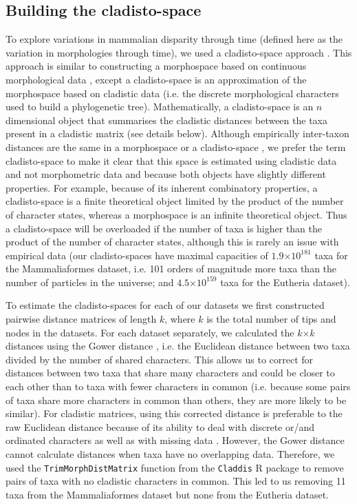 \documentclass[10pt,letterpaper]{article}
\begin{document}
\subsection{Building the cladisto-space}
To explore variations in mammalian disparity through time (defined here as the variation in morphologies through time), we used a cladisto-space approach \citep[e.g.][]{Foote01071994,Foote29111996,Wesley-Hunt2005,Brusatte12092008,friedmanexplosive2010,toljagictriassic-jurassic2013,Hughes20082013}.
This approach is similar to constructing a morphospace based on continuous morphological data \citep[e.g.][]{friedmanexplosive2010}, except a cladisto-space is an approximation of the morphospace based on cladistic data (i.e. the discrete morphological characters used to build a phylogenetic tree).
Mathematically, a cladisto-space is an $n$ dimensional object that summarises the cladistic distances between the taxa present in a cladistic matrix (see details below).
Although empirically inter-taxon distances are the same in a morphospace or a cladisto-space \citep{foth2012different,hetherington2015cladistic}, we prefer the term cladisto-space to make it clear that this space is estimated using cladistic data and not morphometric data and because both objects have slightly different properties.
For example, because of its inherent combinatory properties, a cladisto-space is a finite theoretical object limited by the product of the number of character states, whereas a morphospace is an infinite theoretical object.
Thus a cladisto-space will be overloaded if the number of taxa is higher than the product of the number of character states, although this is rarely an issue with empirical data (our cladisto-spaces have maximal capacities of $1.9$$\times$$10^{181}$ taxa for the Mammaliaformes dataset, i.e. 101 orders of magnitude more taxa than the number of particles in the universe; and $4.5$$\times$$10^{159}$ taxa for the Eutheria dataset).

To estimate the cladisto-spaces for each of our datasets we first constructed pairwise distance matrices of length $k$, where $k$ is the total number of tips and nodes in the datasets.
For each dataset separately, we calculated the $k$$\times$$k$ distances using the Gower distance \citep{Gower71}, i.e. the Euclidean distance between two taxa divided by the number of shared characters. 
This allows us to correct for distances between two taxa that share many characters and could be closer to each other than to taxa with fewer characters in common (i.e. because some pairs of taxa share more characters in common than others, they are more likely to be similar).
For cladistic matrices, using this corrected distance is preferable to the raw Euclidean distance because of its ability to deal with discrete or/and ordinated characters as well as with missing data \citep{anderson2012using}.
However, the Gower distance cannot calculate distances when taxa have no overlapping data.
Therefore, we used the \texttt{TrimMorphDistMatrix} function from the \texttt{Claddis} R package \citep{Claddis} to remove pairs of taxa with no cladistic characters in common.
This led to us removing 11 taxa from the Mammaliaformes dataset but none from the Eutheria dataset.
\end{document}
